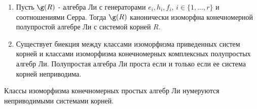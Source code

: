 \documentclass[a4article]{article}
\begin{document}
\begin{theorem}
    \begin{enumerate}
        \item Пусть $\g(R)$ - алгебра Ли с генераторами $e_i, h_i, f_i$, $i \in \{1, \ldots, r\}$ и соотношениями Серра. Тогда $\g(R)$ канонически изоморфна конечномерной полупростой алгебре Ли с системой корней $R$. 
        \item Существует биекция между классами изоморфизма приведенных систем корней и классами изоморфизма конечномерных комплексных полупростых алгебр Ли. Полупростая алгебра Ли проста если и только если ее система корней неприводима.
    \end{enumerate}
\end{theorem}
\begin{corollary}
    Классы изоморфизма конечномерных простых алгебр Ли нумеруются неприводимыми системами корней.
\end{corollary}
\end{document}
